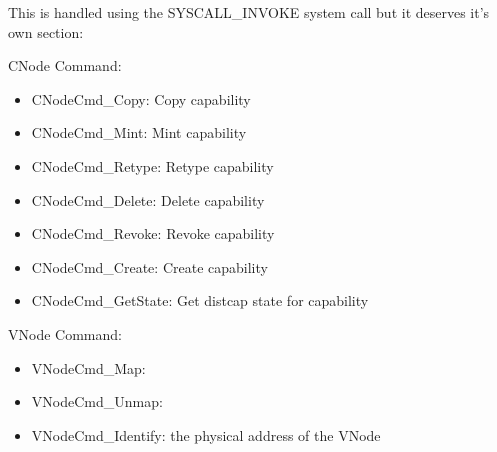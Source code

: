\documentclass[a4paper,11pt,twoside]{report}
\begin{document}
{{This is handled using the SYSCALL\_INVOKE system call but it deserves
it's own section:

CNode Command:
\begin{itemize}
\item CNodeCmd\_Copy: Copy capability
\item CNodeCmd\_Mint: Mint capability
\item CNodeCmd\_Retype: Retype capability
\item CNodeCmd\_Delete: Delete capability
\item CNodeCmd\_Revoke: Revoke capability
\item CNodeCmd\_Create: Create capability
\item CNodeCmd\_GetState: Get distcap state for capability
\end{itemize}

VNode Command:
\begin{itemize}
\item VNodeCmd\_Map:
\item VNodeCmd\_Unmap:
\item VNodeCmd\_Identify: the physical address of the VNode
\end{itemize}

}}
\end{document}
